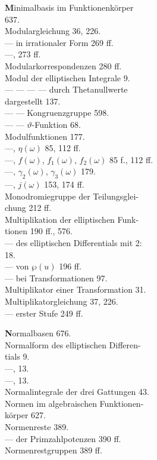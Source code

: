\begin{minipage}[t]{0.48\textwidth}
\noindent \textbf{M}inimalbasis im Funktionenkörper\\
637.\\
Modulargleichung 36, 226.\\
--- in irrationaler Form 269 ff.\\
---,  273 ff.\\
Modularkorrespondenzen 280 ff.\\
Modul der elliptischen Integrale 9.\\
--- --- --- --- durch Thetanullwerte\\
dargestellt 137.\\
--- --- Kongruenzgruppe 598.\\
--- --- $\vartheta$-Funktion 68.\\
Modulfunktionen 177.\\
---, $\eta(\omega)$ 85, 112 ff.\\
---, $f(\omega)$, $f_1(\omega)$, $f_2(\omega)$ 85 f., 112 ff.\\
---, $\gamma_2(\omega)$, $\gamma_3(\omega)$ 179.\\
---, $j(\omega)$ 153, 174 ff.\\
Monodromiegruppe der Teilungsglei-\\
chung 212 ff.\\
Multiplikation der elliptischen Funk-\\
tionen 190 ff., 576.\\
--- des elliptischen Differentials mit 2:\\
18.\\
--- von $\wp(u)$ 196 ff.\\
--- bei Transformationen 97.\\
Multiplikator einer Transformation 31.\\
Multiplikatorgleichung 37, 226.\\
--- erster Stufe 249 ff.

\noindent \textbf{N}ormalbasen 676.\\
Normalform des elliptischen Differen-\\
tials 9.\\
---,  13.\\
---,  13.\\
Normalintegrale der drei Gattungen 43.\\
Normen im algebraischen Funktionen-\\
körper 627.\\
Normenreste 389.\\
--- der Primzahlpotenzen 390 ff.\\
Normenrestgruppen 389 ff.
\end{minipage}
